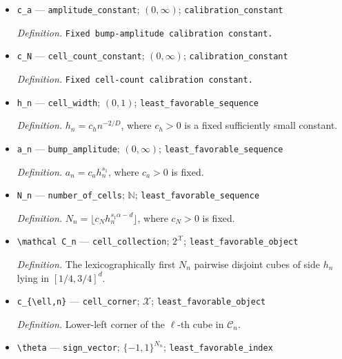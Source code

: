 \documentclass{article}
\begin{document}
\begin{itemize}
  \item \texttt{c\_\allowbreak{}a} --- \texttt{amplitude\_\allowbreak{}constant}; \((0,\infty)\); \texttt{calibration\_\allowbreak{}constant}
  \par\smallskip\noindent\emph{Definition.} \texttt{Fixed bump-\allowbreak{}amplitude calibration constant.}
  \item \texttt{c\_\allowbreak{}N} --- \texttt{cell\_\allowbreak{}count\_\allowbreak{}constant}; \((0,\infty)\); \texttt{calibration\_\allowbreak{}constant}
  \par\smallskip\noindent\emph{Definition.} \texttt{Fixed cell-\allowbreak{}count calibration constant.}
  \item \texttt{h\_\allowbreak{}n} --- \texttt{cell\_\allowbreak{}width}; \((0,1)\); \texttt{least\_\allowbreak{}favorable\_\allowbreak{}sequence}
  \par\smallskip\noindent\emph{Definition.} \(h_n=c_h n^{-2/D}\), where \(c_h>0\) is a fixed sufficiently small constant.
  \item \texttt{a\_\allowbreak{}n} --- \texttt{bump\_\allowbreak{}amplitude}; \((0,\infty)\); \texttt{least\_\allowbreak{}favorable\_\allowbreak{}sequence}
  \par\smallskip\noindent\emph{Definition.} \(a_n=c_a h_n^{s_1}\), where \(c_a>0\) is fixed.
  \item \texttt{N\_\allowbreak{}n} --- \texttt{number\_\allowbreak{}of\_\allowbreak{}cells}; \(\mathbb N\); \texttt{least\_\allowbreak{}favorable\_\allowbreak{}sequence}
  \par\smallskip\noindent\emph{Definition.} \(N_n=\lfloor c_N h_n^{s_1\alpha-d}\rfloor\), where \(c_N>0\) is fixed.
  \item \texttt{\textbackslash{}\allowbreak{}mathcal C\_\allowbreak{}n} --- \texttt{cell\_\allowbreak{}collection}; \(2^{\mathcal X}\); \texttt{least\_\allowbreak{}favorable\_\allowbreak{}object}
  \par\smallskip\noindent\emph{Definition.} The lexicographically first \(N_n\) pairwise disjoint cubes of side \(h_n\) lying in \( [1/4,3/4]^d\).
  \item \texttt{c\_\allowbreak{}\{\textbackslash{}\allowbreak{}ell,\allowbreak{}n\}\allowbreak{}} --- \texttt{cell\_\allowbreak{}corner}; \(\mathcal X\); \texttt{least\_\allowbreak{}favorable\_\allowbreak{}object}
  \par\smallskip\noindent\emph{Definition.} Lower-left corner of the \(\ell\)-th cube in \(\mathcal C_n\).
  \item \texttt{\textbackslash{}\allowbreak{}theta} --- \texttt{sign\_\allowbreak{}vector}; \(\{-1,1\}^{N_n}\); \texttt{least\_\allowbreak{}favorable\_\allowbreak{}index}

\end{itemize}
\end{document}
